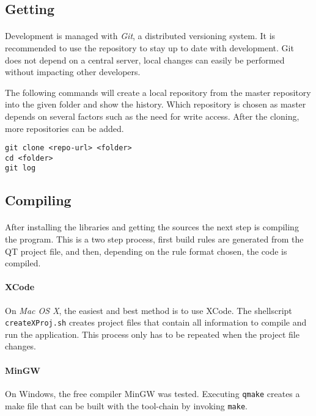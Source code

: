 \subsection{Getting \ER}
\paragraph{}
Development is managed with \textit{Git}\cite{git}, a distributed versioning system.
It is recommended to use the repository to stay up to date with development.
Git does not depend on a central server, local changes can easily be performed without impacting other developers.

The following commands will create a local repository from the master repository into the given folder and show the history.
Which repository is chosen as master depends on several factors such as the need for write access.
After the cloning, more repositories can be added.

\begin{verbatim}
git clone <repo-url> <folder>
cd <folder>
git log
\end{verbatim}


\subsection{Compiling}
\paragraph{}
After installing the libraries and getting the sources the next step is compiling the program.
This is a two step process, first build rules are generated from the QT project file, and then, depending on the rule format chosen, the code is compiled.

\paragraph{XCode}
On \textit{Mac OS X}, the easiest and best method is to use XCode.
The shellscript \texttt{createXProj.sh} creates project files that contain all information to compile and run the application.
This process only has to be repeated when the project file changes.

\paragraph{MinGW}
On Windows, the free compiler MinGW was tested.
Executing \texttt{qmake} creates a make file that can be built with the tool-chain by invoking \texttt{make}.

